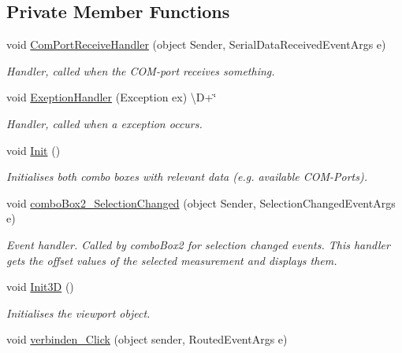 \subsection*{Private Member Functions}
\begin{DoxyCompactItemize}
\item 
void \hyperlink{class_l_i_d_a_r___controller_1_1_main_window_a06e7e925f385b26d3fea4717bf359609}{Com\+Port\+Receive\+Handler} (object Sender, Serial\+Data\+Received\+Event\+Args e)
\begin{DoxyCompactList}\small\item\em Handler, called when the C\+O\+M-\/port receives something. \end{DoxyCompactList}\item 
void \hyperlink{class_l_i_d_a_r___controller_1_1_main_window_a1c0ad2dd56b20d3fdb928b918c0bc153}{Exeption\+Handler} (Exception ex) \textbackslash{}D+\char`\"{}
\begin{DoxyCompactList}\small\item\em Handler, called when a exception occurs. \end{DoxyCompactList}\item 
void \hyperlink{class_l_i_d_a_r___controller_1_1_main_window_a784f9cfcd0edd64ca5aa044112a34b49}{Init} ()
\begin{DoxyCompactList}\small\item\em Initialises both combo boxes with relevant data (e.\+g. available C\+O\+M-\/\+Ports). \end{DoxyCompactList}\item 
void \hyperlink{class_l_i_d_a_r___controller_1_1_main_window_a9d5c30796bf1dac53610783e94d10b37}{combo\+Box2\+\_\+\+Selection\+Changed} (object Sender, Selection\+Changed\+Event\+Args e)
\begin{DoxyCompactList}\small\item\em Event handler. Called by combo\+Box2 for selection changed events. This handler gets the offset values of the selected measurement and displays them. \end{DoxyCompactList}\item 
void \hyperlink{class_l_i_d_a_r___controller_1_1_main_window_acd58042bfc74176a4d65a7f7b9c8b455}{Init3D} ()
\begin{DoxyCompactList}\small\item\em Initialises the viewport object. \end{DoxyCompactList}\item 
void \hyperlink{class_l_i_d_a_r___controller_1_1_main_window_a2447b7c8a7d2310a89212d3cdc90e7f2}{verbinden\+\_\+\+Click} (object sender, Routed\+Event\+Args e)

\end{DoxyCompactItemize}
